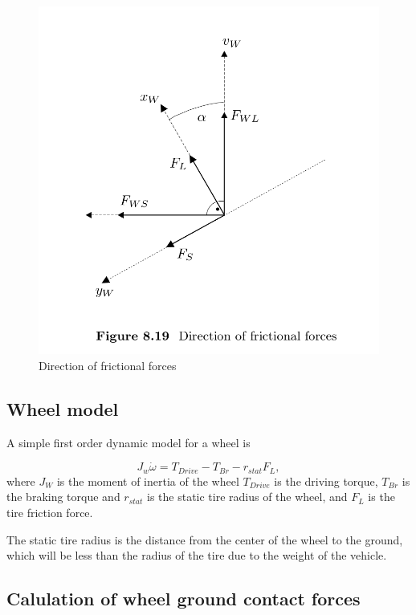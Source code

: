 \begin{figure}
    \centering
    \includegraphics[width=\textwidth]{draft/stolen-figures/direction-of-frictional-forces.png}
    \caption{Direction of frictional forces}
    \label{fig:friction-directions}
\end{figure}



\subsection{Wheel model}

A simple first order dynamic model for a wheel is

\begin{equation}
  J_w \dot{\omega} = T_{Drive} - T_{Br} - r_{stat}F_L,
\end{equation}
where $J_W$ is the moment of inertia of the wheel $T_{Drive}$ is the driving torque, $T_{Br}$ is the braking torque and $r_{stat}$ is the static tire radius of the wheel, and $F_L$ is the tire friction force.

The static tire radius is the distance from the center of the wheel to the ground, which will be less than the radius of the tire due to the weight of the vehicle.


\subsection{Calulation of wheel ground contact forces}

